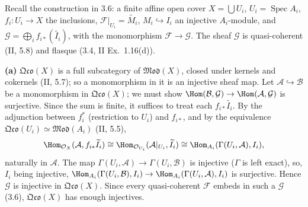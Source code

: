 \documentclass[11pt]{article}
\begin{document}
\pf
Recall the construction in 3.6: a finite affine open cover $X=\bigcup U_i$, $U_i=\operatorname{Spec}A_i$, $f_i:U_i\to X$ the inclusions, $\mathcal F|_{U_i}=\widetilde{M_i}$, $M_i\hookrightarrow I_i$ an injective $A_i$-module, and $\mathcal G=\bigoplus_if_{i*}(\widetilde{I_i})$, with the monomorphism $\mathcal F\to\mathcal G$. The sheaf $\mathcal G$ is quasi-coherent (II, 5.8) and flasque (3.4, II Ex.~1.16(d)).

\textbf{(a)} $\mathfrak{Qco}(X)$ is a full subcategory of $\mathfrak{Mod}(X)$, closed under kernels and cokernels (II, 5.7); so a monomorphism in it is an injective sheaf map. Let $\mathcal A\hookrightarrow\mathcal B$ be a monomorphism in $\mathfrak{Qco}(X)$; we must show $\Hom(\mathcal B,\mathcal G)\to\Hom(\mathcal A,\mathcal G)$ is surjective. Since the sum is finite, it suffices to treat each $f_{i*}\widetilde{I_i}$. By the adjunction between $f_i^*$ (restriction to $U_i$) and $f_{i*}$, and by the equivalence $\mathfrak{Qco}(U_i)\simeq\mathfrak{Mod}(A_i)$ (II, 5.5),
\[
\Hom_{\mathcal O_X}(\mathcal A,f_{i*}\widetilde{I_i})\cong\Hom_{\mathcal O_{U_i}}(\mathcal A|_{U_i},\widetilde{I_i})\cong\Hom_{A_i}(\Gamma(U_i,\mathcal A),I_i),
\]
naturally in $\mathcal A$. The map $\Gamma(U_i,\mathcal A)\to\Gamma(U_i,\mathcal B)$ is injective ($\Gamma$ is left exact), so, $I_i$ being injective, $\Hom_{A_i}(\Gamma(U_i,\mathcal B),I_i)\to\Hom_{A_i}(\Gamma(U_i,\mathcal A),I_i)$ is surjective. Hence $\mathcal G$ is injective in $\mathfrak{Qco}(X)$. Since every quasi-coherent $\mathcal F$ embeds in such a $\mathcal G$ (3.6), $\mathfrak{Qco}(X)$ has enough injectives.
\end{document}

